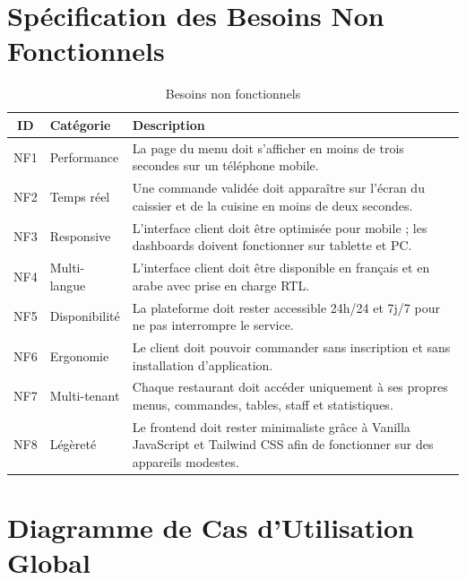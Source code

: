 \documentclass[12pt,a4paper]{report}
\begin{document}
\section{Spécification des Besoins Non Fonctionnels}

\begin{table}[H]
    \centering
    \begin{tabularx}{\textwidth}{c l X}
        \toprule
        \rowcolor{dark!10}
        \textbf{ID} & \textbf{Catégorie} & \textbf{Description} \\
        \midrule
        NF1 & Performance & La page du menu doit s'afficher en moins de trois secondes sur un téléphone mobile. \\
        NF2 & Temps réel & Une commande validée doit apparaître sur l'écran du caissier et de la cuisine en moins de deux secondes. \\
        NF3 & Responsive & L'interface client doit être optimisée pour mobile ; les dashboards doivent fonctionner sur tablette et PC. \\
        NF4 & Multi-langue & L'interface client doit être disponible en français et en arabe avec prise en charge RTL. \\
        NF5 & Disponibilité & La plateforme doit rester accessible 24h/24 et 7j/7 pour ne pas interrompre le service. \\
        NF6 & Ergonomie & Le client doit pouvoir commander sans inscription et sans installation d'application. \\
        NF7 & Multi-tenant & Chaque restaurant doit accéder uniquement à ses propres menus, commandes, tables, staff et statistiques. \\
        NF8 & Légèreté & Le frontend doit rester minimaliste grâce à Vanilla JavaScript et Tailwind CSS afin de fonctionner sur des appareils modestes. \\
        \bottomrule
    \end{tabularx}
    \caption{Besoins non fonctionnels}
    \label{tab:bnf}
\end{table}

\section{Diagramme de Cas d'Utilisation Global}
\end{document}
